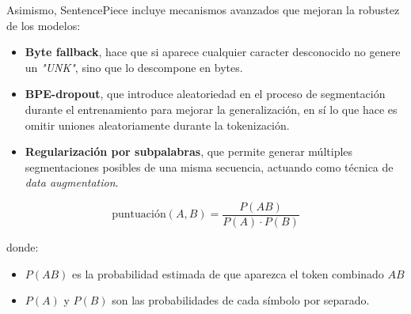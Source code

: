 \documentclass[11pt]{book}
\theoremstyle{plain}
\theoremstyle{definition}
\begin{document}
Asimismo, SentencePiece incluye mecanismos avanzados que mejoran la robustez de los modelos: 
\begin{itemize}
    \item \textbf{Byte fallback}, hace que si aparece cualquier caracter desconocido no genere un \textit{"UNK"}, sino que lo descompone en bytes.
    \item \textbf{BPE-dropout}, que introduce aleatoriedad en el proceso de segmentación durante el entrenamiento para mejorar la generalización, en sí lo que hace es omitir uniones aleatoriamente durante la tokenización.
    \item \textbf{Regularización por subpalabras}, que permite generar múltiples segmentaciones posibles de una misma secuencia, actuando como técnica de \textit{data augmentation}.
\end{itemize}


\[
\text{puntuación}(A,B) = \frac{P(AB)}{P(A) \cdot P(B)}
\]

donde:
\begin{itemize}
    \item $P(AB)$ es la probabilidad estimada de que aparezca el token combinado $AB$
    \item $P(A)$ y $P(B)$ son las probabilidades de cada símbolo por separado.
\end{itemize}
\text{\#\#\#\#\#\#\#\#\#\#\#\#\#\#\#\#\#\#\#\#\#\#\#\#\#\#\#\#\#\#\#\#\#}
\end{document}

